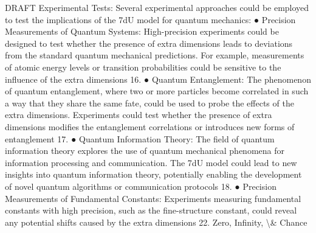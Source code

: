 \documentclass[12pt]{article}
\begin{document}
DRAFT
Experimental Tests:
Several experimental approaches could be employed to test the implications of the 7dU
model for quantum mechanics:
●
Precision Measurements of Quantum Systems: High-precision experiments could
be designed to test whether the presence of extra dimensions leads to deviations
from the standard quantum mechanical predictions. For example, measurements of
atomic energy levels or transition probabilities could be sensitive to the inﬂuence of
the extra dimensions 16.
●
Quantum Entanglement: The phenomenon of quantum entanglement, where two or
more particles become correlated in such a way that they share the same fate,
could be used to probe the eﬀects of the extra dimensions. Experiments could test
whether the presence of extra dimensions modiﬁes the entanglement correlations or
introduces new forms of entanglement 17.
●
Quantum Information Theory: The ﬁeld of quantum information theory explores the
use of quantum mechanical phenomena for information processing and
communication. The 7dU model could lead to new insights into quantum
information theory, potentially enabling the development of novel quantum
algorithms or communication protocols 18.
●
Precision Measurements of Fundamental Constants: Experiments measuring
fundamental constants with high precision, such as the ﬁne-structure constant,
could reveal any potential shifts caused by the extra dimensions 22.
Zero, Infinity, \textbackslash{}& Chance
\end{document}
